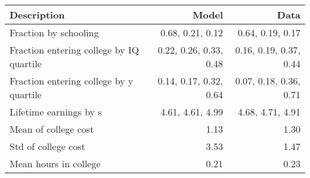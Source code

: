 \begin{tabular}{lrr}
\hline
Description & Model  & Data  \\
\hline
Fraction by schooling & 0.68, 0.21, 0.12  & 0.64, 0.19, 0.17  \\
Fraction entering college by IQ quartile & 0.22, 0.26, 0.33, 0.48  & 0.16, 0.19, 0.37, 0.44  \\
Fraction entering college by y quartile & 0.14, 0.17, 0.32, 0.64  & 0.07, 0.18, 0.36, 0.71  \\
Lifetime earnings by s & 4.61, 4.61, 4.99  & 4.68, 4.71, 4.91  \\
Mean of college cost & 1.13  & 1.30  \\
Std of college cost & 3.53  & 1.47  \\
Mean hours in college & 0.21  & 0.23  \\
\hline
\end{tabular}%
